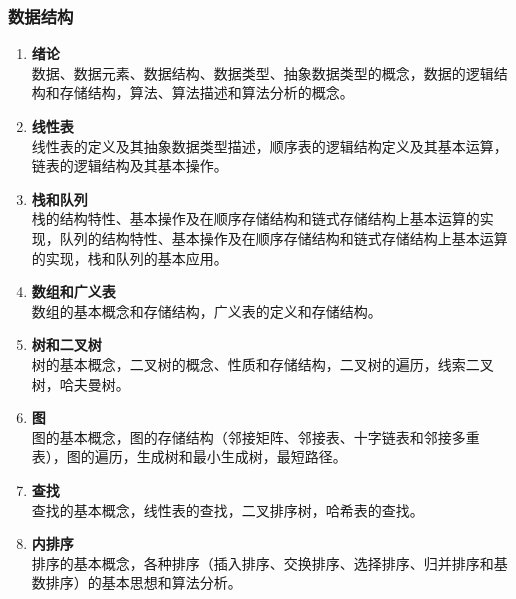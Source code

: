 \documentclass{../note}
\begin{document}
\subsubsection{数据结构}
\begin{enumerate}
	\item \textbf{绪论}\\
	      数据、数据元素、数据结构、数据类型、抽象数据类型的概念，数据的逻辑结构和存储结构，算法、算法描述和算法分析的概念。

	\item \textbf{线性表}\\
	      线性表的定义及其抽象数据类型描述，顺序表的逻辑结构定义及其基本运算，链表的逻辑结构及其基本操作。

	\item \textbf{栈和队列}\\
	      栈的结构特性、基本操作及在顺序存储结构和链式存储结构上基本运算的实现，队列的结构特性、基本操作及在顺序存储结构和链式存储结构上基本运算的实现，栈和队列的基本应用。

	\item \textbf{数组和广义表}\\
	      数组的基本概念和存储结构，广义表的定义和存储结构。

	\item \textbf{树和二叉树}\\
	      树的基本概念，二叉树的概念、性质和存储结构，二叉树的遍历，线索二叉树，哈夫曼树。

	\item \textbf{图}\\
	      图的基本概念，图的存储结构（邻接矩阵、邻接表、十字链表和邻接多重表），图的遍历，生成树和最小生成树，最短路径。

	\item \textbf{查找}\\
	      查找的基本概念，线性表的查找，二叉排序树，哈希表的查找。

	\item \textbf{内排序}\\
	      排序的基本概念，各种排序（插入排序、交换排序、选择排序、归并排序和基数排序）的基本思想和算法分析。
\end{enumerate}
\end{document}
